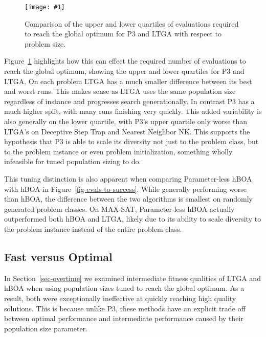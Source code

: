 \documentclass[twoside]{article}
\newcommand{\includegraphicsfit}[1]
{\texttt{[image: \#1]}}
\begin{document}
\begin{figure}
  \begin{center}
  \includegraphicsfit{evals-to-success-range}
  \end{center}
  \caption{Comparison of the upper and lower quartiles of evaluations required
           to reach the global optimum for P3 and LTGA with respect to problem size.}
  \label{fig-evals-to-success-range}
\end{figure}


Figure~\ref{fig-evals-to-success-range}
highlights how this can effect the required number of evaluations to reach the global optimum, showing
the upper and lower quartiles for P3 and LTGA. On each problem
LTGA has a much smaller difference between its best and worst runs. This makes sense as LTGA uses the same
population size regardless of instance and progresses search generationally. In contrast P3 has a much
higher split, with many runs finishing very quickly. This added variability is also generally on the lower
quartile, with P3's upper quartile only worse than LTGA's on Deceptive Step Trap and Nearest
Neighbor NK. This supports the hypothesis that P3 is able to scale its diversity not just
to the problem class, but to the problem instance or even problem initialization, something
wholly infeasible for tuned population sizing to do.

This tuning distinction is also apparent when comparing Parameter-less hBOA with hBOA in Figure~\ref{fig-evals-to-success}.
While generally performing worse than hBOA, the difference between the two algorithms is smallest
on randomly generated problem classes. On MAX-SAT, Parameter-less hBOA actually outperformed both hBOA and LTGA,
likely due to its ability to scale diversity to the problem instance instead of the entire problem class.

\subsection{Fast versus Optimal}
\label{sec-fast-vs-optimal}

In Section~\ref{sec-overtime} we examined intermediate fitness qualities of LTGA and hBOA when using
population sizes tuned to reach the global optimum. As a result, both were exceptionally ineffective
at quickly reaching high quality solutions. This is because unlike P3, these methods have an explicit
trade off between optimal performance and intermediate performance caused by their population size parameter.
\end{document}
